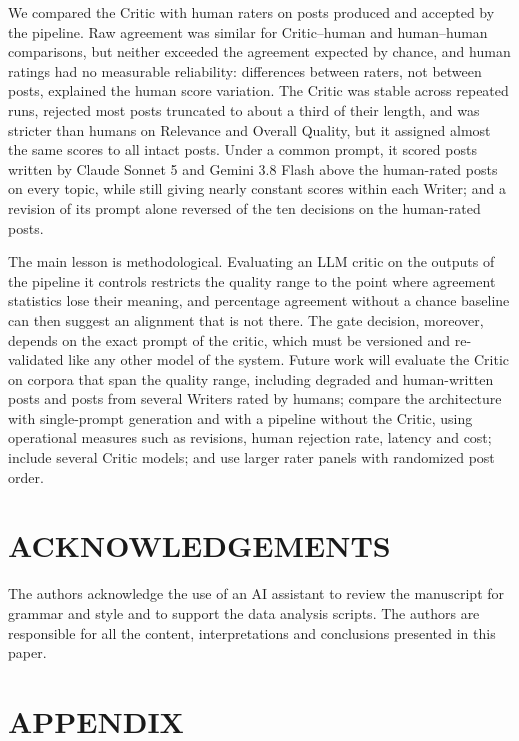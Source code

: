 \documentclass[a4paper,twoside]{article}
\begin{document}
We compared the Critic with \NRaters{} human raters on \NPosts{} posts produced and accepted by the pipeline. Raw agreement was similar for Critic--human and human--human comparisons, but neither exceeded the agreement expected by chance, and human ratings had no measurable reliability: differences between raters, not between posts, explained the human score variation. The Critic was stable across repeated runs, rejected most posts truncated to about a third of their length, and was stricter than humans on Relevance and Overall Quality, but it assigned almost the same scores to all intact posts. Under a common prompt, it scored posts written by Claude Sonnet 5 and Gemini 3.8 Flash above the human-rated posts on every topic, while still giving nearly constant scores within each Writer; and a revision of its prompt alone reversed \BmShiftDecisions{} of the ten decisions on the human-rated posts.

The main lesson is methodological. Evaluating an LLM critic on the outputs of the pipeline it controls restricts the quality range to the point where agreement statistics lose their meaning, and percentage agreement without a chance baseline can then suggest an alignment that is not there. The gate decision, moreover, depends on the exact prompt of the critic, which must be versioned and re-validated like any other model of the system. Future work will evaluate the Critic on corpora that span the quality range, including degraded and human-written posts and posts from several Writers rated by humans; compare the architecture with single-prompt generation and with a pipeline without the Critic, using operational measures such as revisions, human rejection rate, latency and cost; include several Critic models; and use larger rater panels with randomized post order.

\section*{\uppercase{Acknowledgements}}

The authors acknowledge the use of an AI assistant to review the manuscript for grammar and style and to support the data analysis scripts. The authors are responsible for all the content, interpretations and conclusions presented in this paper.


{\small
}

\section*{\uppercase{Appendix}}
\end{document}
